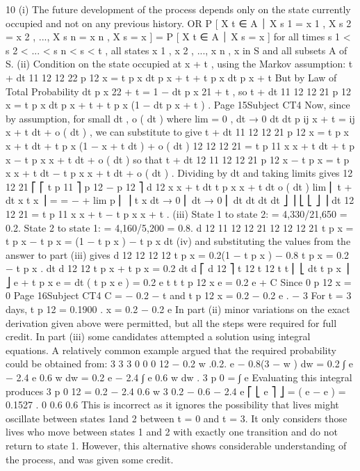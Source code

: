 


10
(i)
The future development of the process depends only on the state currently occupied
and not on any previous history.
OR
P [ X t ∈ A ⏐ X s 1 = x 1 , X s 2 = x 2 , ..., X s n = x n , X s = x ] = P [ X t ∈ A ⏐ X s = x ]
for all times s 1 < s 2 < ... < s n < s < t , all states x 1 , x 2 , ..., x n , x in S and all subsets A of
S.
(ii)
Condition on the state occupied at x + t , using the Markov assumption:
t + dt
11
12
12
22
p 12
x = t p x dt p x + t + t p x dt p x + t
But by Law of Total Probability dt p x 22 + t = 1 − dt p x 21 + t , so
t + dt
11
12
12
21
p 12
x = t p x dt p x + t + t p x (1 − dt p x + t ) .
Page 15Subject CT4 %
Now, since by assumption, for small dt ,
o ( dt )
where lim
= 0 ,
dt → 0 dt
dt
p ij x + t = \mu ij x + t dt + o ( dt ) ,
we can substitute to give
t + dt
11 12
12
21
p 12
x = t p x \mu x + t dt + t p x (1 − \mu x + t dt ) + o ( dt )
12
12
12 21
= t p 11
x \mu x + t dt + t p x − t p x \mu x + t dt + o ( dt )
so that
t + dt
12
11 12
12 21
p 12
x − t p x = t p x \mu x + t dt − t p x \mu x + t dt + o ( dt ) .
Dividing by dt and taking limits gives
12
12 21
⎡
⎡ t p 11
⎤
p 12 − p 12 ⎤ d 12
x \mu x + t dt
t p x \mu x + t dt o ( dt )
lim ⎢ t + dt x t x ⎥ =
=
−
+
lim
p
⎢
⎥
t x
dt → 0 ⎢
dt → 0 ⎢
dt
dt
dt
dt ⎦ ⎥
⎣
⎣
⎦ ⎥ dt
12
12 21
= t p 11
x \mu x + t − t p x \mu x + t .
(iii)
State 1 to state 2:  = 4,330/21,650 = 0.2.
State 2 to state 1:  = 4,160/5,200 = 0.8.
d 12
11 12
12 21
12
12
12 21
t p x = t p x \mu − t p x \mu = \mu (1 − t p x ) − t p x \mu
dt
(iv)
and substituting the values from the answer to part (iii) gives
d 12
12
12
12
t p x = 0.2(1 − t p x ) − 0.8 t p x = 0.2 − t p x .
dt
d
12
12
t p x + t p x = 0.2
dt
d
⎡ d 12 ⎤ t
12 t
12 t
t
⎢ ⎣ dt t p x ⎥ ⎦ e + t p x e = dt ( t p x e ) = 0.2 e
t
t
t
p 12
x e = 0.2 e + C
Since 0 p 12
x = 0
Page 16Subject CT4 %
C = − 0.2
− t
and t p 12
x = 0.2 − 0.2 e .
− 3
For t = 3 days, t p 12
= 0.1900 .
x = 0.2 − 0.2 e
In part (ii) minor variations on the exact derivation given above were permitted, but all the
steps were required for full credit. In part (iii) some candidates attempted a solution using
integral equations. A relatively common example argued that the required probability could
be obtained from:
3 3 3
0 0 0
12
− 0.2 w
.0.2. e − 0.8(3 − w ) dw = 0.2 ∫ e − 2.4 e 0.6 w dw = 0.2 e − 2.4 ∫ e 0.6 w dw .
3 p 0 = ∫ e
Evaluating this integral produces 3 p 0 12 =
0.2 − 2.4 0.6 w 3 0.2 − 0.6 − 2.4
e ⎡ ⎣ e ⎤ ⎦ =
( e − e ) = 0.1527 .
0
0.6
0.6
This is incorrect as it ignores the possibility that lives might oscillate between states 1and 2
between t = 0 and t = 3. It only considers those lives who move between states 1 and 2 with
exactly one transition and do not return to state 1. However, this alternative shows
considerable understanding of the process, and was given some credit.
